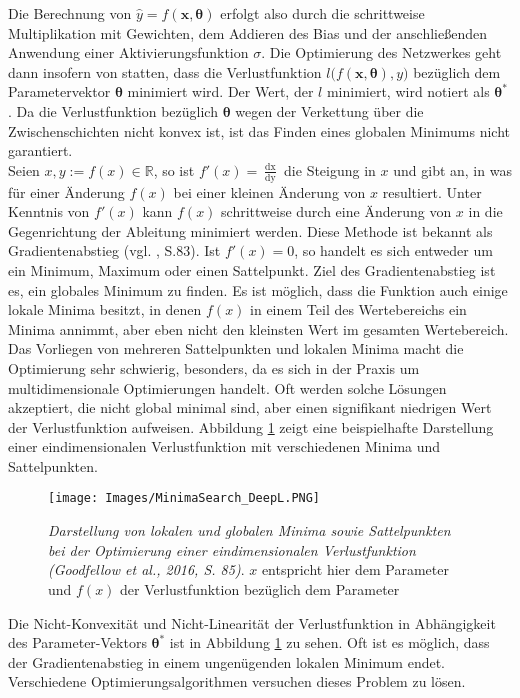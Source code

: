 \documentclass[a4paper,11pt]{article}
\begin{document}
Die Berechnung von $\hat{y} = f(\bm{x}, \bm{\theta})$ erfolgt also durch die schrittweise Multiplikation mit Gewichten, dem Addieren des Bias und der anschließenden Anwendung einer Aktivierungsfunktion $\sigma$.
Die Optimierung des Netzwerkes geht dann insofern von statten, dass die Verlustfunktion $l \bigl(f(\bm{x}, \bm{\theta}), y \bigr)$ bezüglich dem Parametervektor $\bm{\theta}$ minimiert wird.
Der Wert, der $l$ minimiert, wird notiert als $\bm{\theta}^\ast$ . Da die Verlustfunktion bezüglich $\bm{\theta}$ wegen der Verkettung über die Zwischenschichten nicht konvex ist, ist das Finden eines globalen Minimums nicht garantiert. \\
Seien $x, y := f(x) \in \mathbb{R}$, so ist $f'(x) = \frac{\mathop{dx}}{\mathop{dy}}$ die Steigung in $x$ und gibt an, in was für einer Änderung $f(x)$ bei einer kleinen Änderung von $x$ resultiert. Unter Kenntnis von $f'(x)$ kann $f(x)$ schrittweise durch eine Änderung von $x$ in die Gegenrichtung der Ableitung minimiert werden. Diese Methode ist bekannt als Gradientenabstieg (vgl. \cite{deepL}, S.83). 
Ist $f'(x) = 0$, so handelt es sich entweder um ein Minimum, Maximum oder einen Sattelpunkt. Ziel des Gradientenabstieg ist es, ein globales Minimum zu finden. Es ist möglich, dass die Funktion auch einige lokale Minima besitzt, in denen $f(x)$ in einem Teil des Wertebereichs ein Minima annimmt, aber eben nicht den kleinsten Wert im gesamten Wertebereich. Das Vorliegen von mehreren Sattelpunkten und lokalen Minima macht die Optimierung sehr schwierig, besonders, da es sich in der Praxis um multidimensionale Optimierungen handelt. Oft werden solche Lösungen akzeptiert, die nicht global minimal sind, aber einen signifikant niedrigen Wert der Verlustfunktion aufweisen. Abbildung \ref{abb:MinimaSearch} zeigt eine beispielhafte Darstellung einer eindimensionalen Verlustfunktion mit verschiedenen Minima und Sattelpunkten.

\begin{figure}[!ht]
\begin{center}
\texttt{[image: Images/MinimaSearch\_DeepL.PNG]}
\caption{\textit{Darstellung von lokalen und globalen Minima sowie Sattelpunkten bei der Optimierung einer eindimensionalen Verlustfunktion (Goodfellow et al., 2016, S. 85)}. $x$ entspricht hier dem Parameter und $f(x)$ der Verlustfunktion bezüglich dem Parameter}
\label{abb:MinimaSearch}
\end{center}
\end{figure}

Die Nicht-Konvexität und Nicht-Linearität der Verlustfunktion in Abhängigkeit des Parameter-Vektors $\bm{\theta}^\ast$ ist in Abbildung \ref{abb:MinimaSearch} zu sehen. Oft ist es möglich, dass der Gradientenabstieg in einem ungenügenden lokalen Minimum endet. Verschiedene Optimierungsalgorithmen versuchen dieses Problem zu lösen.\\
\end{document}
